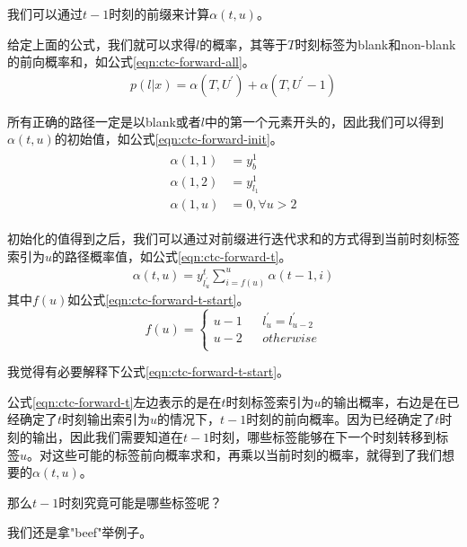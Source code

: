 我们可以通过$t-1$时刻的前缀来计算$\alpha(t,u)$。

给定上面的公式，我们就可以求得$l$的概率，其等于$T$时刻标签为blank和non-blank的前向概率和，如公式\ref{eqn:ctc-forward-all}。
\begin{align}
\label{eqn:ctc-forward-all}
  p(l|x) = \alpha(T, U^{'}) + \alpha(T, U^{'}-1) 
\end{align}

所有正确的路径一定是以blank或者$l$中的第一个元素开头的，因此我们可以得到$\alpha(t,u)$的初始值，如公式\ref{eqn:ctc-forward-init}。
\begin{align}
\label{eqn:ctc-forward-init}
  \begin{split}
    \alpha(1,1) &= y_{b}^1  \\
    \alpha(1,2) &= y_{l_{1}}^1 \\
    \alpha(1,u) &= 0, \forall u > 2
  \end{split}
\end{align}

初始化的值得到之后，我们可以通过对前缀进行迭代求和的方式得到当前时刻标签索引为$u$的路径概率值，如公式\ref{eqn:ctc-forward-t}。
\begin{align}
\label{eqn:ctc-forward-t}
  \alpha(t,u) = y_{l_{u}^{'}}^{t}\sum_{i=f(u)}^{u} \alpha(t-1,i) 
\end{align}
其中$f(u)$如公式\ref{eqn:ctc-forward-t-start}。
\begin{equation}
\label{eqn:ctc-forward-t-start}
f(u)=\left\{
\begin{array}{rcl}
u-1 & & l_u^{'}=l_{u-2}^{'}\\
u-2 & & otherwise\\
\end{array} \right.
\end{equation}

我觉得有必要解释下公式\ref{eqn:ctc-forward-t-start}。

公式\ref{eqn:ctc-forward-t}左边表示的是在$t$时刻标签索引为$u$的输出概率，右边是在已经确定了$t$时刻输出索引为$u$的情况下，$t-1$时刻的前向概率。因为已经确定了$t$时刻的输出，因此我们需要知道在$t-1$时刻，哪些标签能够在下一个时刻转移到标签$u$。对这些可能的标签前向概率求和，再乘以当前时刻的概率，就得到了我们想要的$\alpha(t,u)$。

那么$t-1$时刻究竟可能是哪些标签呢？

我们还是拿"beef"举例子。

